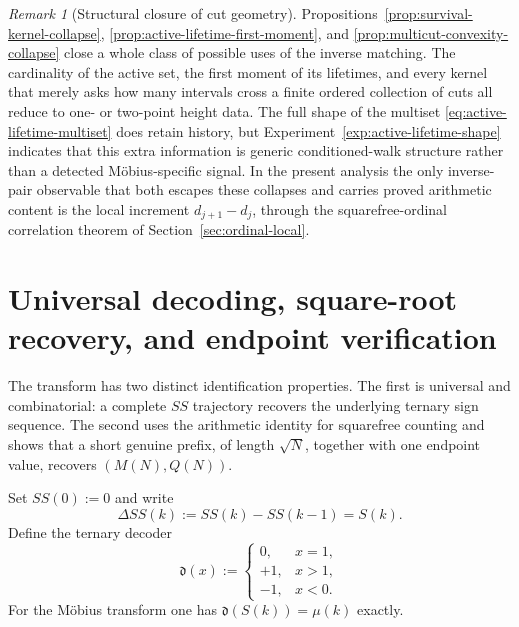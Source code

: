 \documentclass[11pt]{amsart}
\numberwithin{equation}{section}
\theoremstyle{plain}
\theoremstyle{definition}
\theoremstyle{remark}
\newtheorem{remark}[theorem]{Remark}
\begin{document}
\begin{remark}[Structural closure of cut geometry]
\label{rem:survival-kernel-negative}
Propositions~\ref{prop:survival-kernel-collapse},
\ref{prop:active-lifetime-first-moment}, and
\ref{prop:multicut-convexity-collapse} close a whole class of possible uses of
the inverse matching.  The cardinality of the active set, the first moment of
its lifetimes, and every kernel that merely asks how many intervals cross a
finite ordered collection of cuts all reduce to one- or two-point height data.
The full shape of the multiset \eqref{eq:active-lifetime-multiset} does retain
history, but Experiment~\ref{exp:active-lifetime-shape} indicates that this
extra information is generic conditioned-walk structure rather than a detected
M\"obius-specific signal.  In the present analysis the only inverse-pair
observable that both escapes these collapses and carries proved arithmetic
content is the local increment $d_{j+1}-d_j$, through the squarefree-ordinal
correlation theorem of Section~\ref{sec:ordinal-local}.
\end{remark}


\section{Universal decoding, square-root recovery, and endpoint verification}
\label{sec:recovery}

The transform has two distinct identification properties.  The first is
universal and combinatorial: a complete $SS$ trajectory recovers the underlying
ternary sign sequence.  The second uses the arithmetic identity for squarefree
counting and shows that a short genuine prefix, of length $\sqrt N$, together
with one endpoint value, recovers $(M(N),Q(N))$.

Set $SS(0):=0$ and write
\begin{equation}
\label{eq:ss-increment-decoder}
\Delta SS(k):=SS(k)-SS(k-1)=S(k).
\end{equation}
Define the ternary decoder
\begin{equation}
\label{eq:ternary-decoder}
\mathfrak d(x):=
\begin{cases}
0,&x=1,\\
+1,&x>1,\\
-1,&x<0.
\end{cases}
\end{equation}
For the M\"obius transform one has $\mathfrak d(S(k))=\mu(k)$ exactly.
\end{document}
